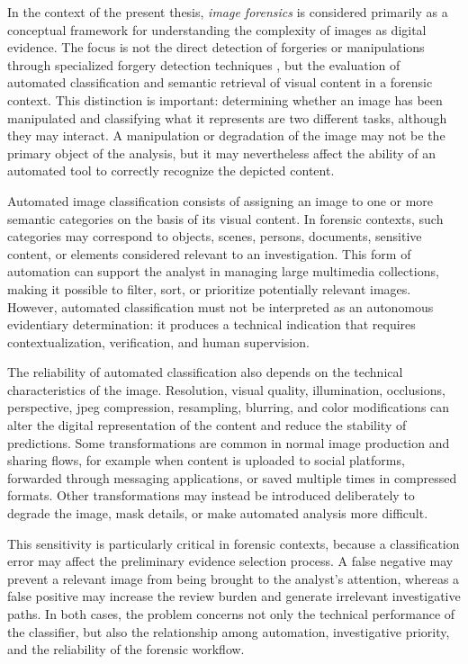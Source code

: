 In the context of the present thesis, \textit{image forensics} is considered
primarily as a conceptual framework for understanding the complexity of images
as digital evidence. The focus is not the direct detection of forgeries or
manipulations through specialized forgery detection techniques
\cite{cozzolino2017recasting}, but the evaluation of automated classification
and semantic retrieval of visual content in a forensic context. This
distinction is important: determining whether an image has been manipulated and
classifying what it represents are two different tasks, although they may
interact. A manipulation or degradation of the image may not be the primary
object of the analysis, but it may nevertheless affect the ability of an
automated tool to correctly recognize the depicted content.

Automated image classification consists of assigning an image to one or more
semantic categories on the basis of its visual content. In forensic contexts,
such categories may correspond to objects, scenes, persons, documents,
sensitive content, or elements considered relevant to an investigation. This
form of automation can support the analyst in managing large multimedia
collections, making it possible to filter, sort, or prioritize potentially
relevant images. However, automated classification must not be interpreted as
an autonomous evidentiary determination: it produces a technical indication
that requires contextualization, verification, and human supervision.

The reliability of automated classification also depends on the technical
characteristics of the image. Resolution, visual quality, illumination,
occlusions, perspective, \gls{jpeg} compression, resampling, blurring, and
color modifications can alter the digital representation of the content and
reduce the stability of predictions. Some transformations are common in normal
image production and sharing flows, for example when content is uploaded to
social platforms, forwarded through messaging applications, or saved multiple
times in compressed formats. Other transformations may instead be introduced
deliberately to degrade the image, mask details, or make automated analysis
more difficult.

This sensitivity is particularly critical in forensic contexts, because a
classification error may affect the preliminary evidence selection process. A
false negative may prevent a relevant image from being brought to the analyst's
attention, whereas a false positive may increase the review burden and generate
irrelevant investigative paths. In both cases, the problem concerns not only the
technical performance of the classifier, but also the relationship among
automation, investigative priority, and the reliability of the forensic
workflow.

